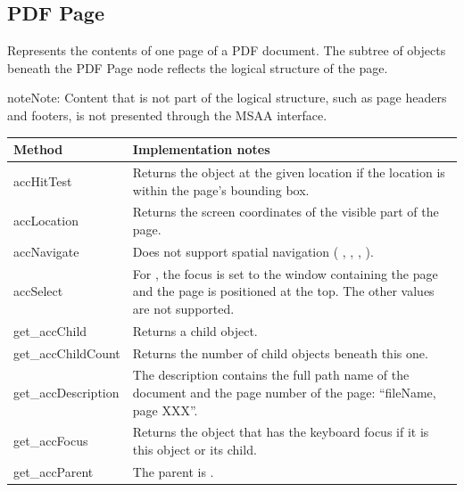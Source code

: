 \documentclass[letterpaper,12pt,english,openany,oneside]{sphinxmanual}
\begin{document}
\subsection{PDF Page}
\label{\detokenize{MSAA_PDF:pdf-page}}
Represents the contents of one page of a PDF document. The subtree of  objects beneath the PDF Page node reflects the logical structure of the page.

\begin{sphinxadmonition}{note}{Note:}
Content that is not part of the logical structure, such as page headers and footers, is not presented through the MSAA interface.
\end{sphinxadmonition}


\begin{savenotes}\sphinxattablestart
\centering
{}\label{\detokenize{MSAA_PDF:section-18}}\nobreak
\begin{tabulary}{\linewidth}[t]{|T|T|}
\hline
\sphinxstyletheadfamily 
Method
&\sphinxstyletheadfamily 
Implementation notes
\\
\hline
accHitTest
&
Returns the object at the given location if the location is within the page’s bounding box.
\\
\hline
accLocation
&
Returns the screen coordinates of the visible part of the page.
\\
\hline
accNavigate
&
Does not support spatial navigation ( ,  ,  ,  ).
\\
\hline
accSelect
&
For  , the focus is set to the window containing the page and the page is positioned at the top. The other  values are not supported.
\\
\hline
get\_accChild
&
Returns a child object.
\\
\hline
get\_accChildCount
&
Returns the number of child objects beneath this one.
\\
\hline
get\_accDescription
&
The description contains the full path name of the document and the page number of the page: “fileName, page XXX”.
\\
\hline
get\_accFocus
&
Returns the object that has the keyboard focus if it is this object or its child.
\\
\hline
get\_accParent
&
The parent is  .
\\

\end{tabulary}
\end{savenotes}
\end{document}
